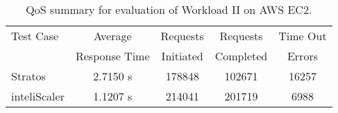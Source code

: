 \begin{table}[h!]
\centering
\caption{QoS summary for evaluation of Workload II on AWS EC2.}
\label{table:analysis_qos_workload_5}
\begin{tabular}{|l|c|c|c|c|}
\hline

Test Case & Average & Requests & Requests & Time Out  \\
& Response Time & Initiated & Completed & Errors \\ \hline

Stratos & 2.7150 s & 178848 & 102671 & 16257\\ \hline

inteliScaler & 1.1207 s & 214041 & 201719 & 6988\\ \hline

\end{tabular}
\end{table}